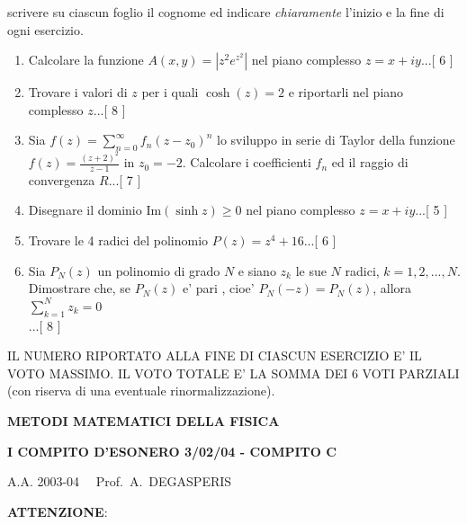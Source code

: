 \documentclass[,12pt]{article}
\begin{document}
\noindent
scrivere su ciascun foglio il cognome ed indicare
\emph{chiaramente} l'inizio e la fine di ogni esercizio.
\vspace{20pt}
\noindent
\begin{enumerate}
\item Calcolare la funzione
$A(x,y)=|z^2 e^{z^2}|$ nel piano complesso
$z=x+iy$...[ 6 ] 
\item Trovare i valori di $z$
per i quali $\cosh(z)=2$ e
riportarli nel piano complesso $z$...[ 8 ]
\item Sia $f(z)=\sum_{n=0}^\infty f_n(z-z_0)^n$ lo sviluppo in serie di
Taylor della funzione $f(z)=\frac{(z+2)^2}{z-1}$ in $z_0=-2$. Calcolare i
coefficienti $f_n$ ed il raggio di convergenza $R$...[ 7 ]
\item Disegnare il dominio Im$(\sinh z) \geq 0$ nel piano complesso
$z=x+iy$...[ 5 ] 
\item Trovare le 4 radici del polinomio
$P(z)=z^4+16$...[ 6 ]
\item Sia $P_N(z)$ un polinomio di grado $N$ e siano $z_k$ le
sue $N$ radici, $k=1,2,...,N$. Dimostrare che, se $P_N(z)$ e' pari
, cioe' $P_N(-z)=P_N(z)$, allora $\sum_{k=1}^Nz_k =0$\\...[ 8 ]

\end{enumerate}

\noindent IL NUMERO RIPORTATO ALLA FINE DI CIASCUN ESERCIZIO
E' IL VOTO MASSIMO. IL VOTO TOTALE E' LA SOMMA DEI 6 VOTI
PARZIALI (con riserva di una eventuale rinormalizzazione).

\newpage

\centerline{\bf{METODI MATEMATICI DELLA FISICA}}

\centerline{\bf{I COMPITO D'ESONERO 3/02/04 - COMPITO C}}

\centerline{A.A. 2003-04 \ \ Prof.\ A.\ DEGASPERIS}
\vspace{20pt}
\noindent
{\bf ATTENZIONE}:
\end{document}
